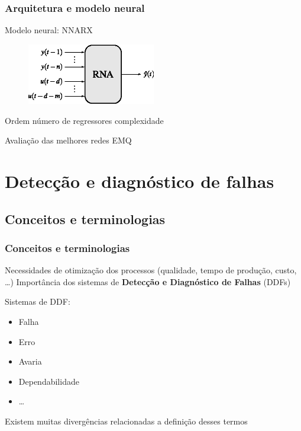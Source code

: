 \documentclass{beamer}
\begin{document}
\begin{frame}
    \frametitle{Arquitetura e modelo neural}

    Modelo neural: NNARX
\begin{figure}[htb]
\centering
    \includegraphics[width=0.5\textwidth]{imgs/rnas/eps/nnarx}
\end{figure}

    Ordem \implica número de regressores \implica complexidade

    \vspace{0.25cm}

    Avaliação das melhores redes \implica EMQ
\end{frame}

\section{Detecção e diagnóstico de falhas}
\subsection{Conceitos e terminologias}
\begin{frame}
    \frametitle{Conceitos e terminologias}

    Necessidades de otimização dos processos (qualidade, tempo de produção,
    custo, \ldots) \implica Importância dos sistemas de {\bf Detecção e 
    Diagnóstico de Falhas} (DDFs)

    \vspace{0.25cm}
    
    Sistemas de DDF:

\begin{itemize}
    \item Falha
    \item Erro
    \item Avaria
    \item Dependabilidade
    \item \ldots
\end{itemize}

    Existem muitas divergências relacionadas a definição desses termos
\end{frame}
\end{document}
